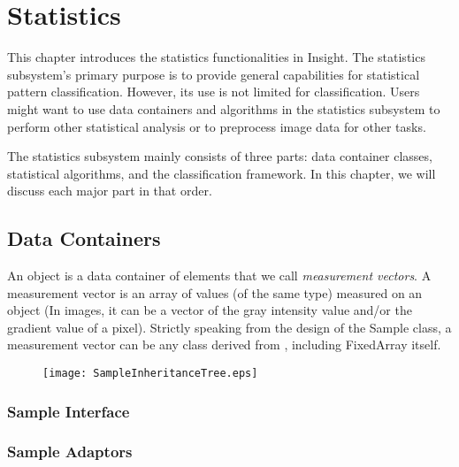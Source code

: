 \chapter{Statistics}
\label{sec:StaisticsFramework}

This chapter introduces the statistics functionalities in Insight. The
statistics subsystem's primary purpose is to provide general capabilities
for statistical pattern classification. However, its use is not limited
for classification. Users might want to use data containers and
algorithms in the statistics subsystem to perform other statistical
analysis or to preprocess image data for other tasks.

The statistics subsystem mainly consists of three parts: data container
classes, statistical algorithms, and the classification framework. In this
chapter, we will discuss each major part in that order.

\section{Data Containers}
\label{sec:StatisticsDataContainer}

An  object is a data container of elements
that we call \emph{measurement vectors}. A measurement vector is an array of
values (of the same type) measured on an object (In images, it can be a
vector of the gray intensity value and/or the gradient value of a
pixel). Strictly speaking from the design of the Sample class, a measurement
vector can be any class derived from , including
FixedArray itself.

\begin{figure}
  \centering
  \texttt{[image: SampleInheritanceTree.eps]}
  \protect\label{fig:SampleInheritanceTree}
\end{figure}

\subsection{Sample Interface}
\label{sec:SampleInterface}

\ifitkFullVersion

\fi

\subsection{Sample Adaptors}
\label{sec:SampleAdaptors}

